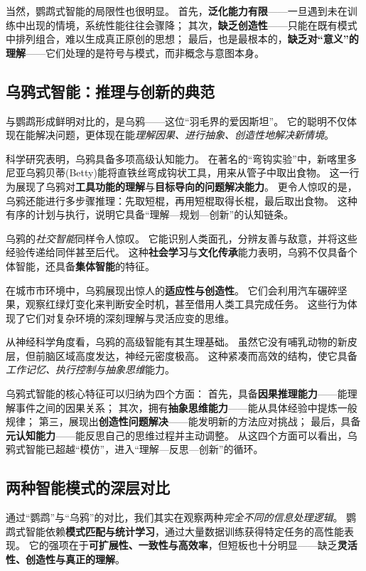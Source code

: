 当然，鹦鹉式智能的局限性也很明显。  
首先，\textbf{泛化能力有限}——一旦遇到未在训练中出现的情境，系统性能往往会骤降；  
其次，\textbf{缺乏创造性}——只能在既有模式中排列组合，难以生成真正原创的思想；  
最后，也是最根本的，\textbf{缺乏对“意义”的理解}——它们处理的是符号与模式，而非概念与意图本身。  

\subsection{乌鸦式智能：推理与创新的典范}  

与鹦鹉形成鲜明对比的，是乌鸦——这位“羽毛界的爱因斯坦”。  
它的聪明不仅体现在能解决问题，更体现在能\emph{理解因果、进行抽象、创造性地解决新情境}。  

科学研究表明，乌鸦具备多项高级认知能力。  
在著名的“弯钩实验”中，新喀里多尼亚乌鸦贝蒂(Betty)能将直铁丝弯成钩状工具，用来从管子中取出食物。  
这一行为展现了乌鸦对\textbf{工具功能的理解}与\textbf{目标导向的问题解决能力}。  
更令人惊叹的是，乌鸦还能进行多步骤推理：先取短棍，再用短棍取得长棍，最后取出食物。  
这种有序的计划与执行，说明它具备“理解—规划—创新”的认知链条。

乌鸦的\emph{社交智能}同样令人惊叹。  
它能识别人类面孔，分辨友善与敌意，并将这些经验传递给同伴甚至后代。  
这种\textbf{社会学习}与\textbf{文化传承}能力表明，乌鸦不仅具备个体智能，还具备\textbf{集体智能}的特征。  

在城市市环境中，乌鸦展现出惊人的\textbf{适应性与创造性}。  
它们会利用汽车碾碎坚果，观察红绿灯变化来判断安全时机，甚至借用人类工具完成任务。  
这些行为体现了它们对复杂环境的深刻理解与灵活应变的思维。  

从神经科学角度看，乌鸦的高级智能有其生理基础。  
虽然它没有哺乳动物的新皮层，但前脑区域高度发达，神经元密度极高。  
这种紧凑而高效的结构，使它具备\emph{工作记忆、执行控制与抽象思维}能力。  

乌鸦式智能的核心特征可以归纳为四个方面：  
首先，具备\textbf{因果推理能力}——能理解事件之间的因果关系；  
其次，拥有\textbf{抽象思维能力}——能从具体经验中提炼一般规律；  
第三，展现出\textbf{创造性问题解决}——能发明新的方法应对挑战；  
最后，具备\textbf{元认知能力}——能反思自己的思维过程并主动调整。  
从这四个方面可以看出，乌鸦式智能已超越“模仿”，进入“理解—反思—创新”的循环。  

\subsection{两种智能模式的深层对比}

通过“鹦鹉”与“乌鸦”的对比，我们其实在观察两种\emph{完全不同的信息处理逻辑}。  
鹦鹉式智能依赖\textbf{模式匹配与统计学习}，通过大量数据训练获得特定任务的高性能表现。  
它的强项在于\textbf{可扩展性、一致性与高效率}，但短板也十分明显——缺乏\textbf{灵活性、创造性与真正的理解}。  


